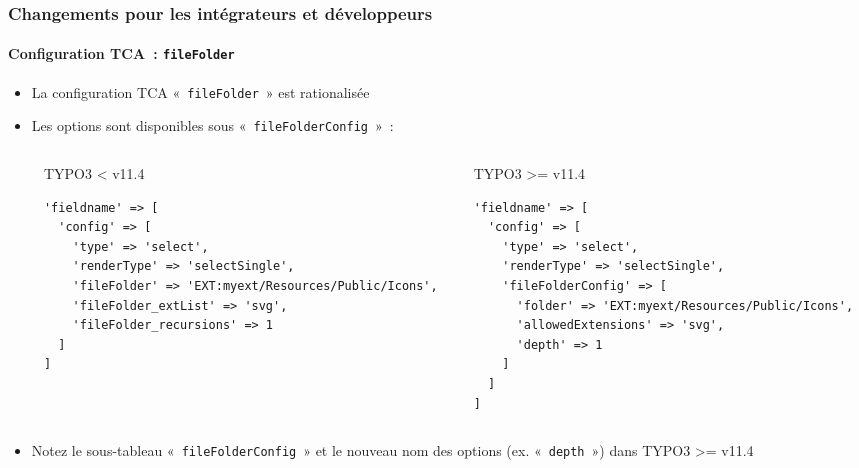 %

\begin{frame}[fragile]
	\frametitle{Changements pour les intégrateurs et développeurs}
	\framesubtitle{Configuration TCA~: \texttt{fileFolder}}


	\begin{itemize}
		\item La configuration TCA «~\texttt{fileFolder}~» est rationalisée
		\item Les options sont disponibles sous «~\texttt{fileFolderConfig}~»~:
	\end{itemize}

	\begin{columns}[T]
		\begin{column}{.04\textwidth}
		\end{column}
		\begin{column}{.48\textwidth}
			\smaller TYPO3 < v11.4 \normalsize
\begin{lstlisting}
'fieldname' => [
  'config' => [
    'type' => 'select',
    'renderType' => 'selectSingle',
    'fileFolder' => 'EXT:myext/Resources/Public/Icons',
    'fileFolder_extList' => 'svg',
    'fileFolder_recursions' => 1
  ]
]
\end{lstlisting}
		\end{column}
		\begin{column}{.48\textwidth}
			\smaller TYPO3 >= v11.4 \normalsize
\begin{lstlisting}
'fieldname' => [
  'config' => [
    'type' => 'select',
    'renderType' => 'selectSingle',
    'fileFolderConfig' => [
      'folder' => 'EXT:myext/Resources/Public/Icons',
      'allowedExtensions' => 'svg',
      'depth' => 1
    ]
  ]
]
\end{lstlisting}
		\end{column}
	\end{columns}

	\begin{itemize}
		\item Notez le sous-tableau «~\texttt{fileFolderConfig}~» et le nouveau nom des options
			(ex. «~\texttt{depth}~») dans TYPO3 >= v11.4
	\end{itemize}

\end{frame}

